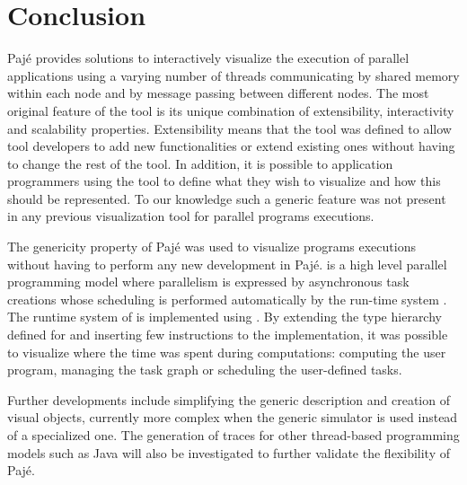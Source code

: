 \section{Conclusion}
\label{sec:conc}

Pajé provides solutions to interactively visualize the execution of
parallel applications using a varying number of threads communicating
by shared memory within each node and by message passing between
different nodes.  The most original feature of the tool is its unique
combination of extensibility, interactivity and scalability
properties. Extensibility means that the tool was defined to allow
tool developers to add new functionalities or extend existing ones
without having to change the rest of the tool. In addition, it is
possible to application programmers using the tool to define what they
wish to visualize and how this should be represented. To our knowledge
such a generic feature was not present in any previous visualization
tool for parallel programs executions.

The genericity property of Pajé was used to visualize  programs
executions without having to perform any new development in Pajé.
 is a high level parallel programming model where parallelism is
expressed by asynchronous task creations whose scheduling is performed
automatically by the run-time system \cite{a1-europar98,a1-pact98}.
The runtime system of  is implemented using \ath. By extending
the type hierarchy defined for \ath and inserting few instructions to
the  implementation, it was possible to visualize where the time
was spent during  computations: computing the user program,
managing the task graph or scheduling the user-defined tasks.

Further developments include simplifying the generic description and
creation of visual objects, currently more complex when the generic
simulator is used instead of a specialized one. The generation of
traces for other thread-based programming models such as Java will
also be investigated to further validate the flexibility of Pajé.

